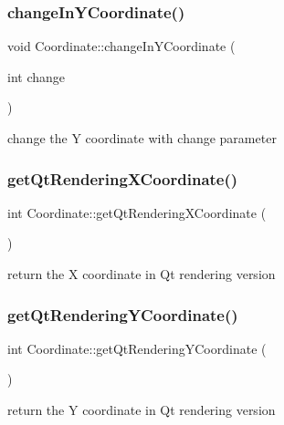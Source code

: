 \subsubsection{\texorpdfstring{change\+In\+Y\+Coordinate()}{changeInYCoordinate()}}
{\footnotesize\ttfamily void Coordinate\+::change\+In\+Y\+Coordinate (\begin{DoxyParamCaption}\item[{int}]{change }\end{DoxyParamCaption})}

change the Y coordinate with \textquotesingle{}change\textquotesingle{} parameter \mbox{\label{class_coordinate_adb2d33e506b944b74cb45657152a6948}} 
\subsubsection{\texorpdfstring{get\+Qt\+Rendering\+X\+Coordinate()}{getQtRenderingXCoordinate()}}
{\footnotesize\ttfamily int Coordinate\+::get\+Qt\+Rendering\+X\+Coordinate (\begin{DoxyParamCaption}{ }\end{DoxyParamCaption})}

return the X coordinate in Qt rendering version \mbox{\label{class_coordinate_a3f71047bac34b137a58a6dcc5ab69df4}} 
\subsubsection{\texorpdfstring{get\+Qt\+Rendering\+Y\+Coordinate()}{getQtRenderingYCoordinate()}}
{\footnotesize\ttfamily int Coordinate\+::get\+Qt\+Rendering\+Y\+Coordinate (\begin{DoxyParamCaption}{ }\end{DoxyParamCaption})}

return the Y coordinate in Qt rendering version \mbox{\label{class_coordinate_a1ab7964582737b9bd19788e08a8a8c6b}} 
